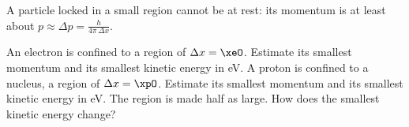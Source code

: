 A particle locked in a small region cannot be at rest: its momentum is at least about $p \approx \Delta p = \frac{h}{4\pi\,\Delta x}$.

\begin{abcliste}
\abc An electron is confined to a region of $\Delta x = \xeO$. Estimate its smallest momentum and its smallest kinetic energy in \si{\electronvolt}.
\abc A proton is confined to a nucleus, a region of $\Delta x = \xpO$. Estimate its smallest momentum and its smallest kinetic energy in \si{\electronvolt}.
\abc The region is made half as large. How does the smallest kinetic energy change?
\end{abcliste}
